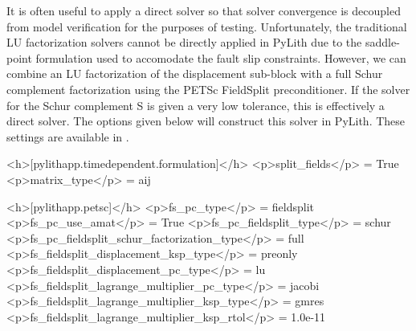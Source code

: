 It is often useful to apply a direct solver so that solver convergence
is decoupled from model verification for the purposes of testing.
Unfortunately, the traditional LU factorization solvers cannot be
directly applied in PyLith due to the saddle-point formulation used
to accomodate the fault slip constraints. However, we can combine
an LU factorization of the displacement sub-block with a full Schur
complement factorization using the PETSc FieldSplit preconditioner.
If the solver for the Schur complement S is given a very low tolerance,
this is effectively a direct solver. The options given below will
construct this solver in PyLith. These settings are available in .
\begin{cfg}
<h>[pylithapp.timedependent.formulation]</h>
<p>split_fields</p> = True
<p>matrix_type</p> = aij

<h>[pylithapp.petsc]</h>
<p>fs_pc_type</p> = fieldsplit
<p>fs_pc_use_amat</p> = True
<p>fs_pc_fieldsplit_type</p> = schur
<p>fs_pc_fieldsplit_schur_factorization_type</p> = full
<p>fs_fieldsplit_displacement_ksp_type</p> = preonly
<p>fs_fieldsplit_displacement_pc_type</p> = lu
<p>fs_fieldsplit_lagrange_multiplier_pc_type</p> = jacobi
<p>fs_fieldsplit_lagrange_multiplier_ksp_type</p> = gmres
<p>fs_fieldsplit_lagrange_multiplier_ksp_rtol</p> = 1.0e-11
\end{cfg}

